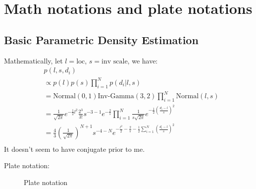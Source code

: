 \newpage
\section{Math notations and plate notations}
\subsection{Basic Parametric Density Estimation}
Mathematically, let $l=\text{loc}$, $s=\text{inv scale}$, we have:
\begin{align*}
     & p(l, s, d_i)                                                                                                                                                \\
     & \propto p(l)p(s)\prod_{i=1}^N p(d_i|l,s)                                                                                                                    \\
     & = \text{Normal}(0,1) \text{Inv-Gamma}(3,2) \prod_{i=1}^N \text{Normal}(l, s)                                                                                \\
     & = \frac{1}{\sqrt{2\pi}}e^{-\frac{1}{2}l^2} \frac{2^3}{3!}s^{-3-1} e^{-\frac{2}{s}} \prod_{i=1}^N \frac{1}{s\sqrt{2\pi}} e^{-\frac{1}{2}(\frac{d_i-l}{s})^2} \\
     & = \frac{4}{3} (\frac{1}{\sqrt{2\pi}})^{N+1} s^{-4-N} e^{-\frac{l^2}{2} -\frac{2}{s} - \frac{1}{2}\sum_{i=1}^N (\frac{d_i-l}{s})^2}                          \\
\end{align*}
It doesn't seem to have conjugate prior to me.

Plate notation:
\begin{figure}[h]
    \centering
    \caption{Plate notation}
\end{figure}

